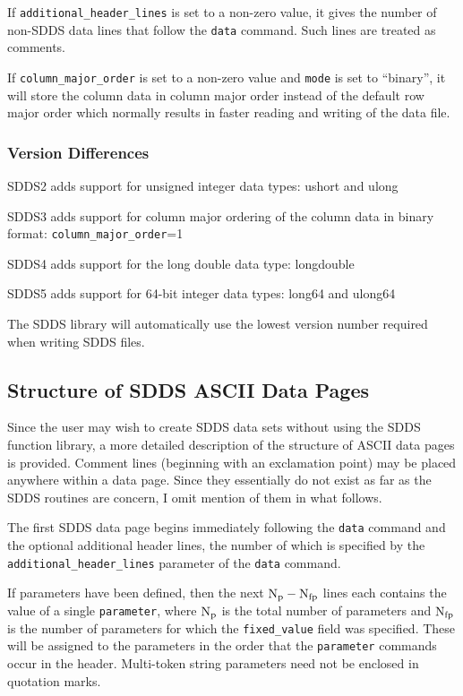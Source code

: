 \documentclass[11pt]{article}
\begin{document}
If {\tt additional\_header\_lines} is set to a non-zero value, it gives the number of non-SDDS data lines that follow the {\tt data} command.  Such lines are treated as comments.

If {\tt column\_major\_order} is set to a non-zero value and {\tt mode} is set to ``binary'', it will store the column data in column major order instead of the default row major order which normally results in faster reading and writing of the data file.

\subsubsection{Version Differences}

SDDS2 adds support for unsigned integer data types: ushort and ulong

SDDS3 adds support for column major ordering of the column data in binary format: {\tt column\_major\_order}=1

SDDS4 adds support for the long double data type: longdouble

SDDS5 adds support for 64-bit integer data types: long64 and ulong64

The SDDS library will automatically use the lowest version number required when writing SDDS files.

\subsection{Structure of SDDS ASCII Data Pages}

Since the user may wish to create SDDS data sets without using the SDDS function library, a more detailed description of the structure of ASCII data pages is provided.  Comment lines (beginning with an exclamation point) may be placed anywhere within a data page.  Since they essentially do not exist as far as the SDDS routines are concern, I omit mention of them in what follows.

The first SDDS data page begins immediately following the {\tt data} command and the optional additional header lines, the number of which is specified by the \verb|additional_header_lines| parameter of the {\tt data} command.

If parameters have been defined, then the next ${\rm N_p-N_{fp}}$ lines each contains the value of a single {\tt parameter}, where ${\rm N_p}$ is the total number of parameters and ${\rm N_{fp}}$ is the number of parameters for which the \verb|fixed_value| field was specified.  These will be assigned to the parameters in the order that the \verb|parameter| commands occur in the header.  Multi-token string parameters need not be enclosed in quotation marks.
\end{document}
